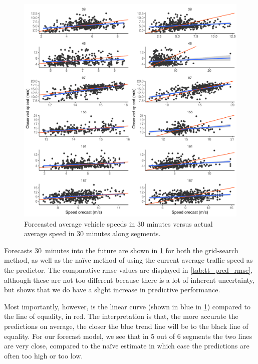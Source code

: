 \begin{knitrout}\small
{}\color{fgcolor}\begin{figure}

{\centering \includegraphics[width=\linewidth]{figure/tt_week1_pred-1} 

}

\caption[Forecasted average vehicle speeds in 30 minutes versus actual average speed in 30 minutes along segments]{Forecasted average vehicle speeds in 30 minutes versus actual average speed in 30 minutes along segments.}\label{fig:tt_week1_pred}
\end{figure}


\end{knitrout}


Forecasts 30~minutes into the future are shown in \cref{fig:tt_week1_pred} for both the grid-search method, as well as the na\"ive method of using the current average traffic speed as the predictor. The comparative \gls{rmse} values are displayed in \cref{tab:tt_pred_rmse}, although these are not too different because there is a lot of inherent uncertainty, but shows that we do have a slight increase in predictive performance.


Most importantly, however, is the linear curve (shown in blue in \cref{fig:tt_week1_pred}) compared to the line of equality, in red. The interpretation is that, the more accurate the predictions on average, the closer the blue trend line will be to the black line of equality. For our forecast model, we see that in 5 out of 6 segments the two lines are very close, compared to the na\"ive estimate in which case the predictions are often too high or too low.


